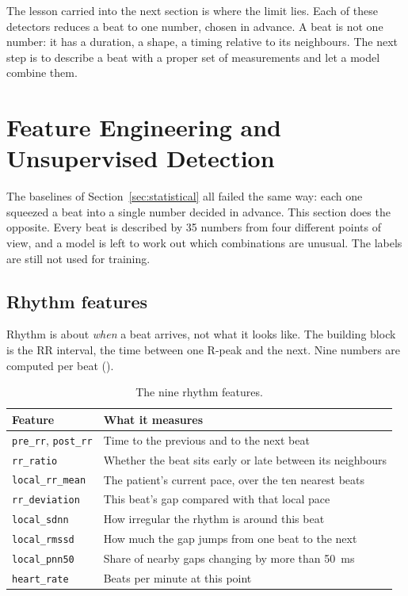 \documentclass[a4paper, 12pt]{article}
\begin{document}
The lesson carried into the next section is where the limit lies. Each of these
detectors reduces a beat to one number, chosen in advance. A beat is not one
number: it has a duration, a shape, a timing relative to its neighbours. The next
step is to describe a beat with a proper set of measurements and let a model
combine them.



\section{Feature Engineering and Unsupervised Detection} \label{sec:features}

The baselines of Section~\ref{sec:statistical} all failed the same way: each one
squeezed a beat into a single number decided in advance. This section does the
opposite. Every beat is described by 35 numbers from four different points of
view, and a model is left to work out which combinations are unusual. The labels
are still not used for training.

\subsection{Rhythm features} \label{subsec:rhythm}

Rhythm is about \emph{when} a beat arrives, not what it looks like. The building
block is the RR interval, the time between one R-peak and the next. Nine numbers
are computed per beat ().

\begin{table}[htbp]
  \centering
  \small
  \caption{The nine rhythm features.}
  \label{tab:rhythmfeat}
  \begin{tabular}{@{}lp{}@{}}
    \toprule
    \textbf{Feature} & \textbf{What it measures} \\
    \midrule
    \texttt{pre\_rr}, \texttt{post\_rr} & Time to the previous and to the next beat \\
    \texttt{rr\_ratio}      & Whether the beat sits early or late between its neighbours \\
    \texttt{local\_rr\_mean}& The patient's current pace, over the ten nearest beats \\
    \texttt{rr\_deviation}  & This beat's gap compared with that local pace \\
    \texttt{local\_sdnn}    & How irregular the rhythm is around this beat \\
    \texttt{local\_rmssd}   & How much the gap jumps from one beat to the next \\
    \texttt{local\_pnn50}   & Share of nearby gaps changing by more than \SI{50}{\milli\second} \\
    \texttt{heart\_rate}    & Beats per minute at this point \\
    \bottomrule
  \end{tabular}
\end{table}
\end{document}
